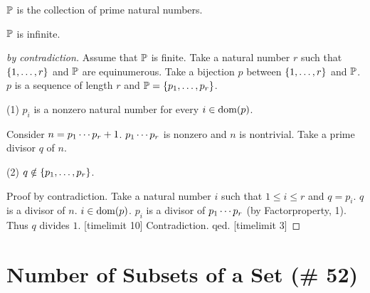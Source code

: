 \documentclass{article}
\begin{document}
\begin{forthel}

\begin{signature}
$\mathbb{P}$ is the collection of prime natural numbers.
\end{signature}

\begin{theorem}[Euclid]
$\mathbb{P}$ is infinite.
\end{theorem}
\begin{proof}[by contradiction]
Assume that $\mathbb{P}$ is finite.
Take a natural number $r$ such that $\{1,\dots,r\}$ and $\mathbb{P}$ are equinumerous.
Take a bijection $p$ between $\{1,\dots,r\}$ and $\mathbb{P}$.
$p$ is a sequence of length $r$ and 
$\mathbb{P} = \{p_{1},\dots,p_{r}\}$.

(1) $p_{i}$ is a nonzero natural number for every
$i \in  \operatorname{dom}(p)$.

Consider $n = p_{1} \cdots p_{r}+1$.
$p_{1} \cdots p_{r}$ is nonzero
and $n$ is nontrivial.
Take a prime divisor $q$ of $n$.

(2) $q \notin \{p_{1},\dots,p_{r}\}$.

Proof by contradiction.
Take a natural number $i$ such that $1 \leq i \leq r$
and $q=p_{i}$.
$q$ is a divisor of $n$.
$i \in \operatorname{dom}(p)$. 
$p_{i}$ is a divisor of $p_{1} \cdots p_{r}$
(by Factorproperty, 1).
Thus $q$ divides $1$. [timelimit 10]
Contradiction. qed.
[timelimit 3]
\end{proof}
\end{forthel}


\section{Number of Subsets of a Set (\# 52)}
\end{document}
